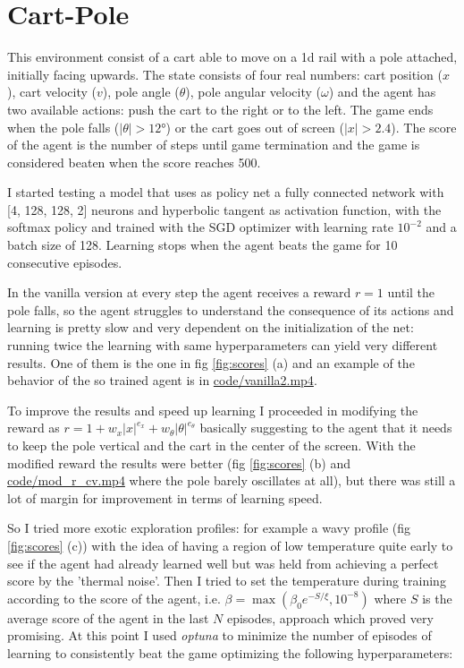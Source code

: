 \documentclass[a4paper, 11pt]{article}
\begin{document}
\section{Cart-Pole}
  This environment consist of a cart able to move on a 1d rail with a pole attached, initially facing upwards. The state consists of four real numbers: cart position ($x$), cart velocity ($v$), pole angle ($\theta$), pole angular velocity ($\omega$) and the agent has two available actions: push the cart to the right or to the left. The game ends when the pole falls ($|\theta| > 12°$) or the cart goes out of screen ($|x| > 2.4$). The score of the agent is the number of steps until game termination and the game is considered beaten when the score reaches 500.

  I started testing a model that uses as policy net a fully connected network with [4, 128, 128, 2] neurons and hyperbolic tangent as activation function, with the softmax policy and trained with the SGD optimizer with learning rate $10^{-2}$ and a batch size of 128. Learning stops when the agent beats the game for 10 consecutive episodes.

  In the vanilla version at every step the agent receives a reward $r = 1$ until the pole falls, so the agent struggles to understand the consequence of its actions and learning is pretty slow and very dependent on the initialization of the net: running twice the learning with same hyperparameters can yield very different results. One of them is the one in fig \ref{fig:scores} (a) and an example of the behavior of the so trained agent is in \url{code/vanilla2.mp4}.

  To improve the results and speed up learning I proceeded in modifying the reward as $r = 1 + w_x |x|^{e_x} + w_\theta |\theta|^{e_\theta}$ basically suggesting to the agent that it needs to keep the pole vertical and the cart in the center of the screen.
  With the modified reward the results were better (fig \ref{fig:scores} (b) and \url{code/mod_r_cv.mp4} where the pole barely oscillates at all), but there was still a lot of margin for improvement in terms of learning speed.

  So I tried more exotic exploration profiles: for example a wavy profile (fig \ref{fig:scores} (c)) with the idea of having a region of low temperature quite early to see if the agent had already learned well but was held from achieving a perfect score by the 'thermal noise'.
  Then I tried to set the temperature during training according to the score of the agent, i.e. $\beta = \max(\beta_0 e^{-S/\xi}, 10^{-8})$ where $S$ is the average score of the agent in the last $N$ episodes, approach which proved very promising. At this point I used \emph{optuna} to minimize the number of episodes of learning to consistently beat the game optimizing the following hyperparameters:
\end{document}
